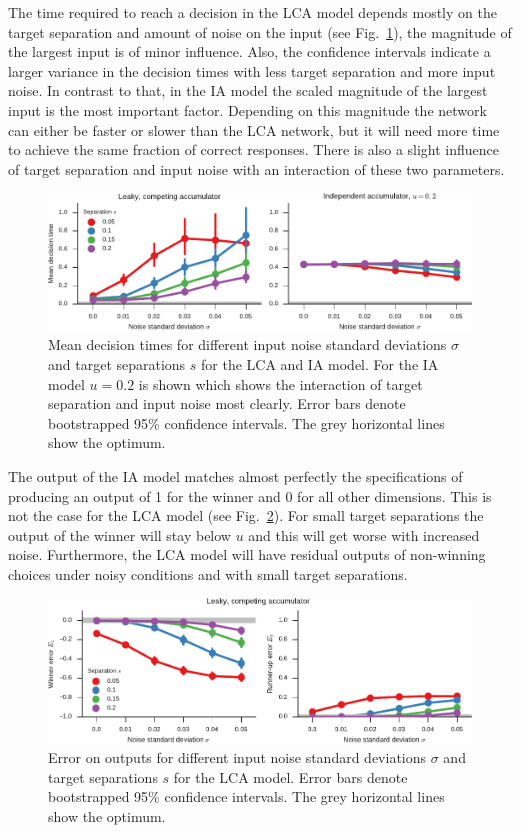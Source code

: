 \documentclass[10pt,letterpaper]{article}
\begin{document}
The time required to reach a decision in the LCA model depends mostly on the target separation and amount of noise on the input (see Fig.~\ref{fig:time}), 
the magnitude of the largest input is of minor influence.
Also, the confidence intervals indicate a larger variance in the decision times with less target separation and more input noise.
In contrast to that, in the IA model the scaled magnitude of the largest input is the most important factor.
Depending on this magnitude the network can either be faster or slower than the LCA network, but it will need more time to achieve the same fraction of correct responses.
There is also a slight influence of target separation and input noise with an interaction of these two parameters.
\begin{figure}
    \centering
    \includegraphics{figures/time}
    \caption{Mean decision times for different input noise standard deviations 
        $\sigma$ and target separations $s$ for the LCA and IA model. For the IA 
        model $u = 0.2$ is shown which shows the interaction of target 
        separation and input noise most clearly. Error bars denote bootstrapped 
        95\% confidence intervals.  The grey horizontal lines show the 
        optimum.}\label{fig:time}
\end{figure}

The output of the IA model matches almost perfectly the specifications of producing an output of 1 for the winner and 0 for all other dimensions.
This is not the case for the LCA model (see Fig.~\ref{fig:error}).
For small target separations the output of the winner will stay below $u$ and this will get worse with increased noise.
Furthermore, the LCA model will have residual outputs of non-winning choices under noisy conditions and with small target separations.
\begin{figure}
    \centering
    \includegraphics{figures/error}
    \caption{Error on outputs for different input noise standard deviations 
        $\sigma$ and target separations $s$ for the LCA model.  Error bars 
        denote bootstrapped 95\% confidence intervals. The grey horizontal lines 
        show the optimum.}\label{fig:error}
\end{figure}
\end{document}

